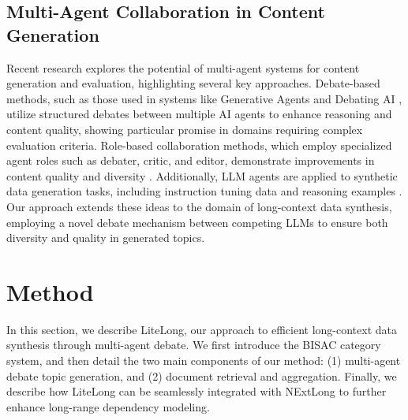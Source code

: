 \documentclass{article}
\theoremstyle{plain}
\theoremstyle{definition}
\theoremstyle{remark}
\begin{document}
\subsection{Multi-Agent Collaboration in Content Generation}
    Recent research explores the potential of multi-agent systems for content generation and evaluation, highlighting several key approaches. Debate-based methods, such as those used in systems like Generative Agents \cite{park2023generative} and Debating AI \cite{irving2018ai}, utilize structured debates between multiple AI agents to enhance reasoning and content quality, showing particular promise in domains requiring complex evaluation criteria. Role-based collaboration methods, which employ specialized agent roles such as debater, critic, and editor, demonstrate improvements in content quality and diversity \cite{du2023improving, wu2023autogen}. Additionally, LLM agents are applied to synthetic data generation tasks, including instruction tuning data \cite{xu2024wizardlm} and reasoning examples \cite{wang2022self}. Our approach extends these ideas to the domain of long-context data synthesis, employing a novel debate mechanism between competing LLMs to ensure both diversity and quality in generated topics.

\section{Method}
    In this section, we describe LiteLong, our approach to efficient long-context data synthesis through multi-agent debate. We first introduce the BISAC \cite{martinez2016bisac} category system, and then detail the two main components of our method: (1) multi-agent debate topic generation, and (2) document retrieval and aggregation. Finally, we describe how LiteLong can be seamlessly integrated with NExtLong to further enhance long-range dependency modeling.
\end{document}
